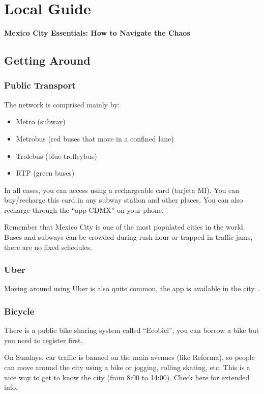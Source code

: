 \chapter{Local Guide}

{\bf\Large Mexico City Essentials: How to Navigate the Chaos}

\section*{Getting Around}

\subsection*{Public Transport}
The network is comprised mainly by:

\begin{itemize}
\setlength\parskip{0em}
\setlength\itemsep{0.3em}
\item Metro (subway)
\item Metrobus (red buses that move in a confined lane)
\item Trolebus (blue trolleybus)
\item RTP  (green buses)
\end{itemize}

In all cases, you can access using a rechargeable card (tarjeta MI). You can buy/recharge this card in any subway station and other places. You  can also recharge through the ``app CDMX'' on your phone.

Remember that Mexico City is one of the most populated cities in the world. Buses and subways can be crowded during rush hour or trapped in traffic jams, there are no fixed schedules.

\subsection*{Uber}

Moving around using Uber is also quite common, the app is available in the city. .

\subsection*{Bicycle}

There is a public bike sharing system called ``Ecobici'', you can borrow a bike but you need to register first.

On Sundays, car traffic is banned on the main avenues (like Reforma), so people can move around the city using a bike or jogging, rolling skating, etc. This is a nice way to get to know the city (from 8:00 to 14:00). Check here for extended info.

